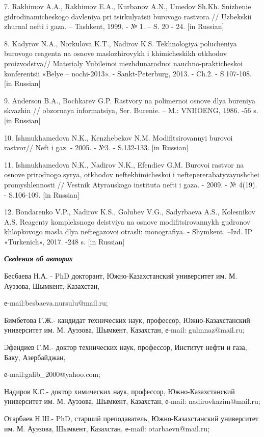 7. Rakhimov A.A., Rakhimov E.A., Kurbanov A.N., Umedov Sh.Kh. Snizhenie
gidrodinamicheskogo davleniya pri tsirkulyatsii burovogo rastvora //
Uzbekskii zhurnal nefti i gaza. -- Tashkent, 1999. - № 1. -- S. 20 - 24.
{[}in Russian{]}

8. Kadyrov N.A., Norkulova K.T., Nadirov K.S. Tekhnologiya polucheniya
burovogo reagenta na osnove maslozhirovykh i khimicheskikh otkhodov
proizvodstva// Materialy Yubileinoi mezhdunarodnoi nauchno-prakticheskoi
konferentsii «Belye -- nochi-2013». - Sankt-Peterburg, 2013. - Ch.2. -
S.107-108. {[}in Russian{]}

9. Anderson B.A., Bochkarev G.P. Rastvory na polimernoi osnove dlya
bureniya skvazhin // obzornaya informatsiya, Ser. Burenie. -- M.:
VNIIOENG, 1986. -56 s. {[}in Russian{]}

10. Ishmukhamedova N.K., Kenzhebekov N.M. Modifitsirovannyi burovoi
rastvor// Neft\textquotesingle{} i gaz. - 2005. - №3. - S.132-133. {[}in
Russian{]}

11. Ishmukhamedova N.K., Nadirov N.K., Efendiev G.M. Burovoi rastvor na
osnove prirodnogo syr\textquotesingle ya, otkhodov neftekhimicheskoi i
neftepererabatyvayushchei promyshlennosti // Vestnik Atyrauskogo
instituta nefti i gaza. - 2009. - № 4(19). - S.106-109. {[}in Russian{]}

12. Bondarenko V.P., Nadirov K.S., Golubev V.G., Sadyrbaeva A.S.,
Kolesnikov A.S. Reagenty kompleksnogo deistviya na osnove
modifitsirovannykh gudronov khlopkovogo masla dlya neftegazovoi otrasli:
monografiya. - Shymkent. --Izd. IP «Turkenich», 2017. -248 s. {[}in
Russian{]}

\emph{{\bfseries Сведения об авторах}}

Бесбаева Н.А. - PhD докторант, Южно-Казахстанский университет им. М.
Ауэзова, Шымкент, Казахстан,

е-mail:besbaeva.nursulu@mail.ru;

Бимбетова Г.Ж.- кандидат технических наук, профессор, Южно-Казахстанский
университет им. М. Ауэзова, Шымкент, Казахстан, е-mail: gulmnaz@mail.ru;

Эфендиев Г.М.- доктор технических наук, профессор, Институт нефти и
газа, Баку, Азербайджан,

е-mail:galib\_2000@yahoo.com;

Надиров К.С.- доктор химических наук, профессор, Южно-Казахстанский
университет им. М. Ауэзова, Шымкент, Казахстан, е-mail:
nadirovkazim@mail.ru;

Отарбаев Н.Ш.- PhD, старший преподаватель, Южно-Казахстанский
университет им. М. Ауэзова, Шымкент, Казахстан, е-mail:
otarbaevn@mail.ru;

